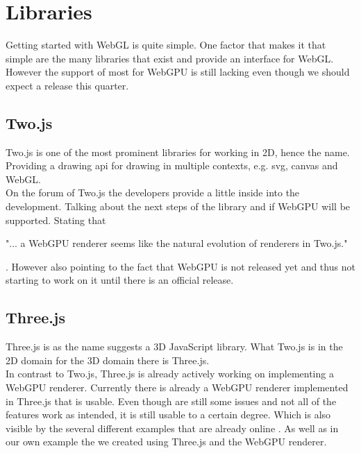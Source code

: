 %
%
% 
% 

\chapter{Libraries}

\label{chap:Libraries}

Getting started with WebGL is quite simple. 
One factor that makes it that simple are the many libraries that exist and provide an interface for WebGL.
However the support of most for WebGPU is still lacking even though we should expect a release this quarter.

\section{Two.js}

Two.js is one of the most prominent libraries for working in 2D, hence the name.
Providing a drawing api for drawing in multiple contexts, e.g. svg, canvas and WebGL.\\
On the forum of Two.js the developers provide a little inside into the development.
Talking about the next steps of the library and if WebGPU will be supported.
Stating that \begin{displayquote} "... a WebGPU renderer seems like the natural evolution of renderers in Two.js." \end{displayquote}\parencite{two_quote}.
However also pointing to the fact that WebGPU is not released yet and thus not starting to work on it until there is an official release.

\section{Three.js}

Three.js is as the name suggests a 3D JavaScript library. 
What Two.js is in the 2D domain for the 3D domain there is Three.js.\\
In contrast to Two.js, Three.js is already actively working on implementing a WebGPU renderer.
Currently there is already a WebGPU renderer implemented in Three.js that is usable. 
Even though are still some issues and not all of the features work as intended, it is still usable to a certain degree.
Which is also visible by the several different examples that are already online \parencite{three_examples}.
As well as in our own example the we created using Three.js and the WebGPU renderer. \\

